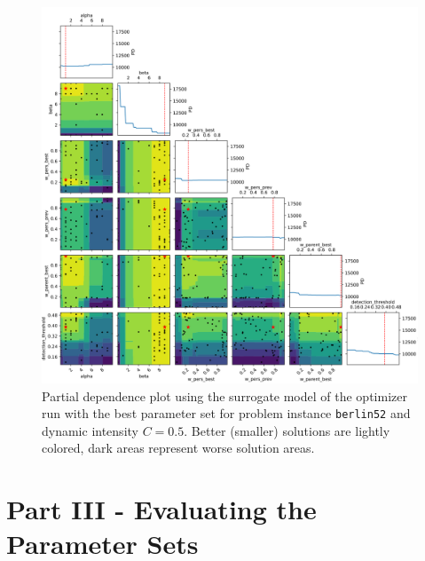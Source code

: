 \begin{figure}[h]
	\centering
	\centerline{\includegraphics[width=1.2\textwidth]{results/part2/partial_dependence_berlin52_C_0.5_run_4.svg}}
	\caption[Partial dependence plot for \texttt{berlin52} and $C=0.5$]{Partial dependence plot using the surrogate model of the optimizer run with the best parameter set for problem instance \texttt{berlin52} and dynamic intensity $C=0.5$. Better (smaller) solutions are lightly colored, dark areas represent worse solution areas.}
	\label{fig:partial_dependence_berlin52_C_05}
\end{figure}

\section{Part III - Evaluating the Parameter Sets}
